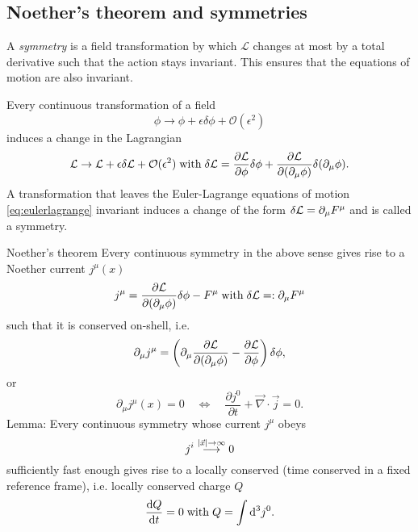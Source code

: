 \subsection{Noether's theorem and symmetries}
\label{subsec:noethersymmetries}
A \emph{symmetry} is a field transformation by which $\mathcal{L}$ changes at most by a total derivative such that the action stays invariant. This ensures that the equations of motion are also invariant.\\
\begin{mybox}{}
	Every continuous transformation of a field
	\begin{equation}
		\phi \rightarrow \phi + \epsilon \delta \phi + \mathcal{O}(\epsilon^2)
	\end{equation}
	induces a change in the Lagrangian
	\begin{equation}
		\mathcal{L} \rightarrow \mathcal{L} + \epsilon \delta \mathcal{L} + \mathcal{O}(\epsilon^2) \; \mathrm{with} \; \delta\mathcal{L} = \frac{\partial \mathcal{L}}{\partial \phi} \delta \phi + \frac{\partial \mathcal{L}}{\partial(\partial_\mu \phi)} \delta(\partial_\mu \phi).
	\end{equation}
	A transformation that leaves the Euler-Lagrange equations of motion \ref{eq:eulerlagrange} invariant induces a change of the form $\delta \mathcal{L} = \partial_\mu F^\mu$ and is called a symmetry.	
\end{mybox}
\begin{mybox}{Noether's theorem}
	Every continuous symmetry in the above sense gives rise to a Noether current $j^{\mu}(x)$ 
	\begin{equation}
		j^\mu = \frac{\partial \mathcal{L}}{\partial(\partial_\mu \phi)} \delta \phi - F^\mu \; \mathrm{with}\; \delta \mathcal{L} =: \partial_\mu F^\mu
	\end{equation}
	such that it is conserved on-shell, i.e.
	\begin{equation}
	\partial_\mu j^\mu = \left(\partial_\mu \frac{\partial \mathcal{L}}{\partial(\partial_\mu \phi)} - \frac{\partial \mathcal{L}}{\partial \phi}\right) \delta \phi,
	\end{equation}
	or
	\begin{equation}
	\partial_{\mu} j^{\mu}(x) = 0 \quad \Leftrightarrow \quad \frac{\partial j^0}{\partial t} + \vec{\nabla}\cdot \vec{j} = 0.
	\end{equation}
	Lemma: Every continuous symmetry whose current $j^\mu$ obeys
	\begin{equation}
	\label{eq:conditionNoether}
		j^i \stackrel{\abs{\vec{x}} \rightarrow\infty}{\longrightarrow} 0
	\end{equation}
	sufficiently fast enough gives rise to a locally conserved (time conserved in a fixed reference frame), i.e. locally conserved charge $Q$
	\begin{equation}
		\frac{\mathrm{d} Q}{\mathrm{d} t} = 0 \; \mathrm{with}\; Q = \int \mathrm{d}^3 j^0.
	\end{equation}
\end{mybox}
